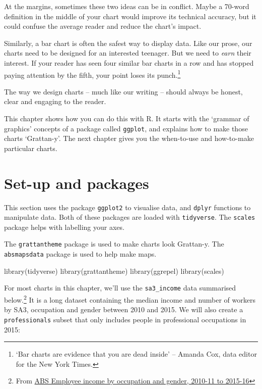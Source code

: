 \documentclass[
]{book}
\newenvironment{Shaded}{\begin{snugshade}}{\end{snugshade}}
\newcommand{\FunctionTok}[1]{\textcolor[rgb]{0.00,0.00,0.00}{#1}}
\newcommand{\NormalTok}[1]{#1}
\begin{document}
At the margins, sometimes these two ideas can be in conflict. Maybe a 70-word definition in the middle of your chart would improve its technical accuracy, but it could confuse the average reader and reduce the chart's impact.

Similarly, a bar chart is often the safest way to display data. Like our prose, our charts need to be designed for an interested teenager. But we need to \emph{earn} their interest. If your reader has seen four similar bar charts in a row and has stopped paying attention by the fifth, your point loses its punch.\footnote{`Bar charts are evidence that you are dead inside' -- Amanda Cox, data editor for the New York Times.}

The way we design charts -- much like our writing -- should always be honest, clear and engaging to the reader.

This chapter shows how you can do this with R. It starts with the `grammar of graphics' concepts of a package called \texttt{ggplot}, and explains how to make those charts `Grattan-y'. The next chapter gives you the when-to-use and how-to-make particular charts.

\hypertarget{set-up-and-packages-1}{%
\section{Set-up and packages}\label{set-up-and-packages-1}}

This section uses the package \texttt{ggplot2} to visualise data, and \texttt{dplyr} functions to manipulate data. Both of these packages are loaded with \texttt{tidyverse}. The \texttt{scales} package helps with labelling your axes.

The \texttt{grattantheme} package is used to make charts look Grattan-y. The \texttt{absmapsdata} package is used to help make maps.

\begin{Shaded}
\begin{Highlighting}[]
\FunctionTok{library}\NormalTok{(tidyverse)}
\FunctionTok{library}\NormalTok{(grattantheme)}
\FunctionTok{library}\NormalTok{(ggrepel)}
\FunctionTok{library}\NormalTok{(scales)}
\end{Highlighting}
\end{Shaded}

For most charts in this chapter, we'll use the \texttt{sa3\_income} data summarised below.\footnote{From \href{https://www.abs.gov.au/AUSSTATS/abs@.nsf/DetailsPage/6524.0.55.0022011-2016?OpenDocument}{ABS Employee income by occupation and gender, 2010-11 to 2015-16}} It is a long dataset containing the median income and number of workers by SA3, occupation and gender between 2010 and 2015. We will also create a \texttt{professionals} subset that only includes people in professional occupations in 2015:
\end{document}
